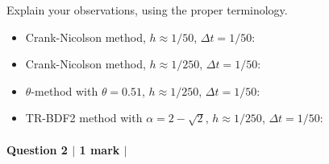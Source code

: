 \documentclass[10pt,letterpaper]{scrartcl}
\begin{document}
Explain your observations, using the proper terminology.

\begin{itemize}
\item Crank-Nicolson method, $h \approx 1/50$, $\Delta t = 1/50$:

\vfill

\item Crank-Nicolson method, $h \approx 1/250$, $\Delta t = 1/50$:

\vfill

\item $\theta$-method with $\theta = 0.51$, $h \approx 1/250$, $\Delta t = 1/50$:

\vfill

\item TR-BDF2 method with $\alpha = 2-\sqrt{2}$, $h \approx 1/250$, $\Delta t = 1/50$:

\vfill
\end{itemize}
\newpage

\paragraph*{Question 2 $\vert$ 1 mark $\vert$ \faFilePdfO}
\end{document}
